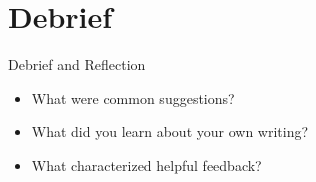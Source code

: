\documentclass{beamer}
\begin{document}
\section{Debrief}
\begin{frame}{Debrief and Reflection}

  \begin{itemize}
    \item What were common suggestions?
    \item What did you learn about your own writing?
    \item What characterized helpful feedback?
  \end{itemize}

\end{frame}
\end{document}
